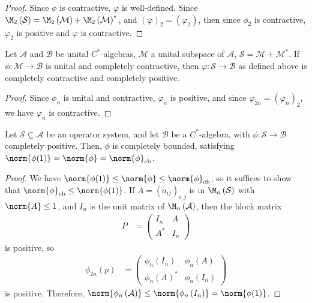 \documentclass[10pt]{mypackage}
\begin{document}
\begin{proof}
  Since $\phi$ is contractive, $\varphi$ is well-defined. Since $\M_2\left( \mathcal{S} \right) = \M_2\left( \mathcal{M} \right) + \M_2\left( \mathcal{M} \right)^{\ast}$, and $ \left( \varphi \right)_2 = \left( \varphi_2 \right) $, then since $\phi_2$ is contractive, $\varphi_2$ is positive and $\varphi$ is contractive.
\end{proof}
\begin{proposition}
  Let $\mathcal{A}$ and $\mathcal{B}$ be unital $C^{\ast}$-algebras, $\mathcal{M}$ a unital subspace of $\mathcal{A}$, $\mathcal{S} = \mathcal{M} + \mathcal{M}^{\ast}$. If $\phi\colon \mathcal{M}\rightarrow \mathcal{B}$ is unital and completely contractive, then $\varphi\colon \mathcal{S}\rightarrow \mathcal{B}$ as defined above is completely contractive and completely positive.
\end{proposition}
\begin{proof}
  Since $\phi_n$ is unital and contractive, $\varphi_n$ is positive, and since $\varphi_{2n} = \left( \varphi_n \right)_2$, we have $\varphi_n$ is contractive.
\end{proof}
\begin{proposition}
  Let $\mathcal{S}\subseteq \mathcal{A}$ be an operator system, and let $\mathcal{B}$ be a $C^{\ast}$-algebra, with $\phi\colon \mathcal{S}\rightarrow \mathcal{B}$ completely positive. Then, $\phi$ is completely bounded, satisfying $\norm{\phi(1)} = \norm{\phi} = \norm{\phi}_{\operatorname{cb}}$.
\end{proposition}
\begin{proof}
  We have $\norm{\phi(1)}\leq \norm{\phi}\leq \norm{\phi}_{\operatorname{cb}}$, so it suffices to show that $\norm{\phi}_{\operatorname{cb}}\leq \norm{\phi(1)}$. If $A = \left( a_{ij} \right)_{i,j}$ is in $\M_n\left( \mathcal{S} \right)$ with $\norm{A}\leq 1$, and $I_n$ is the unit matrix of $\M_n\left( \mathcal{A} \right)$, then the block matrix
  \begin{align*}
    P &= \begin{pmatrix}I_n & A \\ A^{\ast} & I_n\end{pmatrix}
  \end{align*}
  is positive, so
  \begin{align*}
    \phi_{2n}(p) &= \begin{pmatrix}\phi_n\left( I_n \right) & \phi_n\left( A \right) \\ \phi_n\left( A \right)^{\ast} & \phi_n\left( I_n \right)\end{pmatrix}
  \end{align*}
  is positive. Therefore, $\norm{\phi_n\left( \mathcal{A} \right)}\leq \norm{\phi_n\left( I_n \right)} = \norm{\phi(1)}$.
\end{proof}
\end{document}
